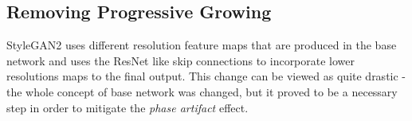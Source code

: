 \documentclass[12pt,a4paper,openany]{book}
\begin{document}
\subsection{Removing Progressive Growing}

StyleGAN2 uses different resolution feature maps that are produced in the base network and uses the ResNet like skip connections to incorporate lower resolutions maps to the final output. This change can be viewed as quite drastic - the whole concept of base network was changed, but it proved to be a necessary step in order to mitigate the \textit{phase artifact} effect.










\end{document}
